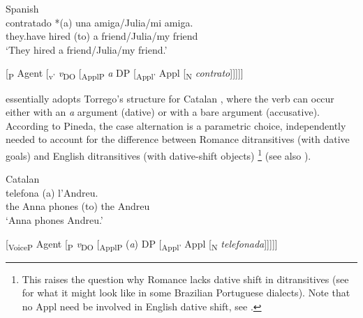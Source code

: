 \documentclass[output=paper,colorlinks,citecolor=brown,nonflat]{./langscibook}
\begin{document}
\ea%
    \label{ex:manzini:2}
    Spanish \citep{Torrego2010}\\
         {contratado}  {*(a)} {una} {amiga/Julia/mi} {amiga.}\\
        they.have   hired      (to) a friend/Julia/my friend\\
    \glt ‘They hired a friend/Julia/my friend.’
\z 

\ea%
    \label{ex:manzini:3}{}
    [\textsubscript{\liv P} Agent [\textsubscript{v’} \textit{v}\textsubscript{DO} [\textsubscript{ApplP} \textit{a} DP [\textsubscript{Appl’} Appl [\textsubscript{N} \textit{contrato}]]]]]
\z

\citet[359--360]{Pineda2016} essentially adopts Torrego’s structure for Catalan , where the verb can occur either with an \textit{a} argument (dative) or with a bare argument (accusative). According to Pineda, the case alternation is a parametric choice, independently needed to account for the difference between Romance ditransitives (with dative goals) and English ditransitives (with dative-shift objects){} \footnote{This raises the question why Romance lacks dative shift in ditransitives (see \citealt{Lima-Salles2016} for what it might look like in some Brazilian Portuguese dialects). Note that no Appl need be involved in English dative shift, see \citet{Kayne1984, Pesetsky1995, Harley2002, BeckJohnson2004}.} (see also \citealt{Pineda2014}).

\ea%
    \label{ex:manzini:4}
    Catalan \citep{Pineda2016}\\
       {telefona}   {(a)} {l’Andreu}.\\
        {the Anna}   phones   (to) {the Andreu}\\
    \glt ‘Anna phones Andreu.’
\z

\ea%
    \label{ex:manzini:5}{}
    [\textsubscript{VoiceP}  Agent [\textsubscript{\liv P} \textit{v}\textsubscript{DO} [\textsubscript{ApplP} (\textit{a}) DP [\textsubscript{Appl’} Appl [\textsubscript{N} \textit{telefonada}]]]]]\\
\z
\end{document}
